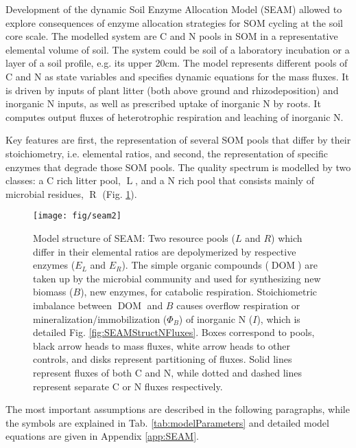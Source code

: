 Development of the dynamic Soil Enzyme Allocation Model
(SEAM) allowed to explore consequences of enzyme allocation strategies for SOM
cycling at the soil core scale. The modelled system are C and N
pools in SOM in a representative elemental volume of soil. The
system could be soil of a laboratory incubation or a layer of a soil profile,
e.g. its upper 20cm.
The model represents different pools of C and N as state variables
and specifies dynamic equations for the mass fluxes. It is driven by inputs of
plant litter (both above ground and rhizodeposition) and inorganic N
inputs, as well as prescribed uptake of inorganic N by roots.  It
computes output fluxes of heterotrophic respiration and leaching of inorganic
N.

Key features are first, the representation of several SOM pools that differ by
their stoichiometry, i.e. elemental ratios, and second, the representation of
specific enzymes that degrade those SOM pools. The quality spectrum is modelled by two
classes: a C rich litter pool,
$\operatorname{L}$, and a N rich pool that consists
mainly of microbial residues, $\operatorname{R}$ (Fig. \ref{fig:SEAMStruct}).

\begin{figure}[t] \vspace*{2mm}
\begin{center}
\texttt{[image: fig/seam2]}
\end{center}
\caption{
Model structure of SEAM: Two resource pools ($L$ and $R$) which differ in their
elemental ratios are depolymerized by respective enzymes ($E_L$ and $E_R$). The
simple organic compounds ($\operatorname{DOM}$) are taken up by the microbial
community  and used for synthesizing new biomass (${B}$), new enzymes, for
catabolic respiration. Stoichiometric imbalance between $\operatorname{DOM}$ and ${B}$
causes overflow respiration or mineralization/immobilization ($\Phi_B$) of
inorganic N ($I$), which is detailed Fig. \ref{fig:SEAMStructNFluxes}. Boxes
correspond to pools, black arrow heads to mass fluxes, white arrow heads to other controls, and disks represent partitioning of fluxes. Solid lines
represent fluxes of both C and N, while dotted and dashed lines represent
separate C or N fluxes respectively.
\label{fig:SEAMStruct}
}
\end{figure}

The most important assumptions are described in the following paragraphs, while
the symbols are explained in Tab. \ref{tab:modelParameters} and detailed model
equations are given in Appendix \ref{app:SEAM}. 

